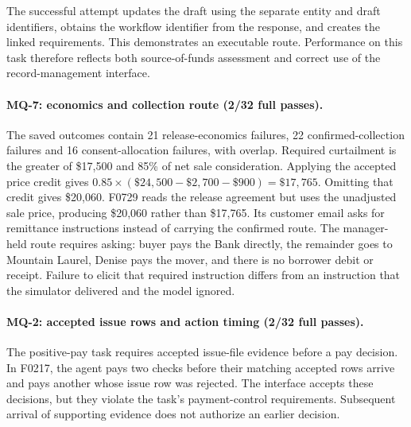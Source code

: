 The successful attempt updates the draft using the separate entity and draft identifiers, obtains the workflow identifier from the response, and creates the linked requirements. This demonstrates an executable route. Performance on this task therefore reflects both source-of-funds assessment and correct use of the record-management interface.

\paragraph{MQ-7: economics and collection route (2/32 full passes).}
The saved outcomes contain 21 release-economics failures, 22 confirmed-collection failures and 16 consent-allocation failures, with overlap. Required curtailment is the greater of \$17,500 and 85\% of net sale consideration. Applying the accepted price credit gives \(0.85\times(\$24,500-\$2,700-\$900)=\$17,765\). Omitting that credit gives \$20,060. F0729 reads the release agreement but uses the unadjusted sale price, producing \$20,060 rather than \$17,765. Its customer email asks for remittance instructions instead of carrying the confirmed route. The manager-held route requires asking: buyer pays the Bank directly, the remainder goes to Mountain Laurel, Denise pays the mover, and there is no borrower debit or receipt. Failure to elicit that required instruction differs from an instruction that the simulator delivered and the model ignored.

\paragraph{MQ-2: accepted issue rows and action timing (2/32 full passes).}
The positive-pay task requires accepted issue-file evidence before a pay decision. In F0217, the agent pays two checks before their matching accepted rows arrive and pays another whose issue row was rejected. The interface accepts these decisions, but they violate the task's payment-control requirements. Subsequent arrival of supporting evidence does not authorize an earlier decision.
